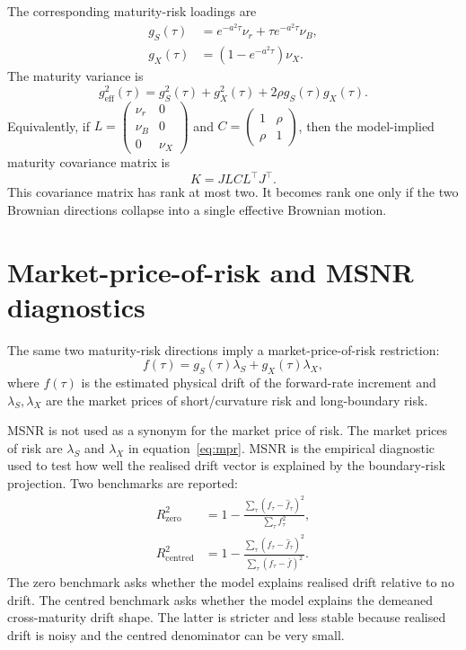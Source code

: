 \documentclass[11pt]{article}
\numberwithin{equation}{section}
\begin{document}
The corresponding maturity-risk loadings are
\begin{align}
 g_S(\tau)&=e^{-a^2\tau}\nu_r+\tau e^{-a^2\tau}\nu_B,
 \label{eq:short-boundary-loading}\\
 g_X(\tau)&=(1-e^{-a^2\tau})\nu_X.
 \label{eq:long-boundary-loading}
\end{align}
The maturity variance is
\begin{equation}
 g_{\mathrm{eff}}^2(\tau)=g_S^2(\tau)+g_X^2(\tau)+2\rho g_S(\tau)g_X(\tau).
 \label{eq:effective-variance}
\end{equation}
Equivalently, if $L=\begin{pmatrix}\nu_r&0\\\nu_B&0\\0&\nu_X\end{pmatrix}$ and $C=\begin{pmatrix}1&\rho\\\rho&1\end{pmatrix}$, then the model-implied maturity covariance matrix is
\begin{equation}
 K=JLC L^\top J^\top.
 \label{eq:covariance-kernel}
\end{equation}
This covariance matrix has rank at most two. It becomes rank one only if the two Brownian directions collapse into a single effective Brownian motion.

\section{Market-price-of-risk and MSNR diagnostics}
The same two maturity-risk directions imply a market-price-of-risk restriction:
\begin{equation}
 f(\tau)=g_S(\tau)\lambda_S+g_X(\tau)\lambda_X,
 \label{eq:mpr}
\end{equation}
where $f(\tau)$ is the estimated physical drift of the forward-rate increment and $\lambda_S,\lambda_X$ are the market prices of short/curvature risk and long-boundary risk.

MSNR is not used as a synonym for the market price of risk. The market prices of risk are $\lambda_S$ and $\lambda_X$ in equation~\eqref{eq:mpr}. MSNR is the empirical diagnostic used to test how well the realised drift vector is explained by the boundary-risk projection. Two benchmarks are reported:
\begin{align}
 R^2_{\mathrm{zero}}&=1-\frac{\sum_\tau(f_\tau-\widehat f_\tau)^2}{\sum_\tau f_\tau^2},
 \label{eq:zero-msnr}\\
 R^2_{\mathrm{centred}}&=1-\frac{\sum_\tau(f_\tau-\widehat f_\tau)^2}{\sum_\tau(f_\tau-\bar f)^2}.
 \label{eq:centred-msnr}
\end{align}
The zero benchmark asks whether the model explains realised drift relative to no drift. The centred benchmark asks whether the model explains the demeaned cross-maturity drift shape. The latter is stricter and less stable because realised drift is noisy and the centred denominator can be very small.
\end{document}
